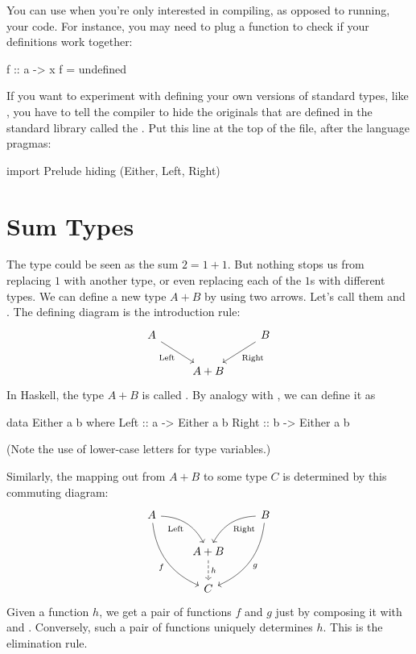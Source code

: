 \documentclass[DaoFP]{subfiles}
\begin{document}
You can use  when you're only interested in compiling, as opposed to running, your code. For instance, you may need to plug a function  to check if your definitions work together:
\begin{haskell}
f :: a -> x
f = undefined
\end{haskell}

If you want to experiment with defining your own versions of standard types, like , you have to tell the compiler to hide the originals that are defined in the standard library called the . Put this line at the top of the file, after the language pragmas:
\begin{haskell}
import Prelude hiding (Either, Left, Right)
\end{haskell}


\section{Sum Types}

The  type could be seen as the sum $2 = 1 + 1$. But nothing stops us from replacing $1$ with another type, or even replacing each of the $1$s with different types. We can define a new type $A + B$ by using two arrows. Let's call them  and . The defining diagram is the introduction rule:
\[
 \begin{tikzcd}
 A
 \arrow[dr,  "\text{Left}"']
 && B
 \arrow[dl, "\text{Right}"]
 \\
&A + B
 \end{tikzcd}
\]
In Haskell, the type $A + B$ is called . By analogy with , we can define it as
\begin{haskell}
data Either a b where
  Left  :: a -> Either a b
  Right :: b -> Either a b
\end{haskell}
 (Note the use of lower-case letters for type variables.)
 
Similarly, the mapping out from $A + B$ to some type $C$ is determined by this commuting diagram:
\[
 \begin{tikzcd}
 A
 \arrow[dr,  bend left, "\text{Left}"']
 \arrow[ddr, bend right, "f"']
 && B
 \arrow[dl, bend right, "\text{Right}"]
 \arrow[ddl, bend left, "g"]
 \\
&A + B
\arrow[d, dashed, "h"]
\\
& C
 \end{tikzcd}
\]
Given a function $h$, we get a pair of functions $f$ and $g$ just by composing it with  and . Conversely, such a pair of functions uniquely determines $h$. This is the elimination rule.
\end{document}
